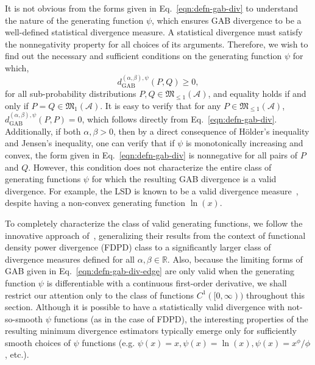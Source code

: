 \documentclass[11pt]{article}
\theoremstyle{plain}
\theoremstyle{remark}
\def\R{\mathbb{R}}
\newcommand{\Acal}{\mathcal{A}}
\newcommand{\Mfrak}{\mathfrak{M}}
\newcommand{\dGAB}{d_{\mathrm{GAB}}}
\newcommand{\todo}[1]{\textcolor{red}{#1}}
\begin{document}
It is not obvious from the forms given in Eq.~\eqref{eqn:defn-gab-div} to understand the nature of the generating function $\psi$, which ensures GAB divergence to be a well-defined statistical divergence measure. A statistical divergence must satisfy the nonnegativity property for all choices of its arguments. Therefore, we wish to find out the necessary and sufficient conditions on the generating function $\psi$ for which,
\begin{equation*}
    \dGAB^{(\alpha, \beta),\psi}(P, Q) \geq 0,
\end{equation*}
\noindent for all sub-probability distributions $P, Q \in \Mfrak_{\leq 1}(\Acal)$, and equality holds if and only if $P = Q \in \Mfrak_{1}(\Acal)$. It is easy to verify that for any $P \in \Mfrak_{\leq 1}(\Acal)$, $\dGAB^{(\alpha,\beta),\psi}(P, P) = 0$, which follows directly from Eq.~\eqref{eqn:defn-gab-div}. Additionally, if both $\alpha, \beta > 0$, then by a direct consequence of H\"{o}lder's inequality and Jensen's inequality, one can verify that if $\psi$ is monotonically increasing and convex, the form given in Eq.~\eqref{eqn:defn-gab-div} is nonnegative for all pairs of $P$ and $Q$. However, this condition does not characterize the entire class of generating functions $\psi$ for which the resulting GAB divergence is a valid divergence. For example, the LSD is known to be a valid divergence measure~\citep{ghosh2017generalized}, despite having a non-convex generating function $\ln(x)$.

To completely characterize the class of valid generating functions, we follow the innovative approach of~\cite{ray2023functional}, generalizing their results from the context of functional density power divergence (FDPD) class to a significantly larger class of divergence measures defined for all $\alpha, \beta \in \R$. Also, because the limiting forms of GAB given in Eq.~\eqref{eqn:defn-gab-div-edge} are only valid when the generating function $\psi$ is differentiable with a continuous first-order derivative, we shall restrict our attention only to the class of functions $C^1([0,\infty))$ throughout this section. Although it is possible to have a statistically valid divergence with not-so-smooth $\psi$ functions (as in the case of FDPD), the interesting properties of the resulting minimum divergence estimators typically emerge only for sufficiently smooth choices of $\psi$ functions (e.g. $\psi(x) = x, \psi(x) = \ln(x), \psi(x) = x^\phi/\phi$, etc.).


\end{document}
